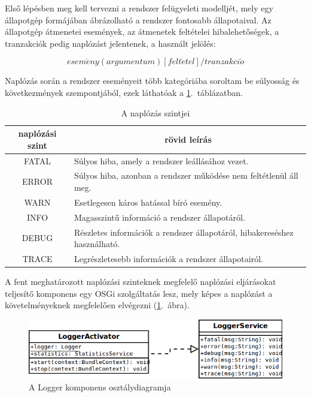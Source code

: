 Első lépésben meg kell tervezni a rendszer felügyeleti modelljét, mely egy állapotgép formájában ábrázolható a rendszer fontosabb állapotaival. Az állapotgép átmenetei események, az átmenetek feltételei hibalehetőségek, a tranzakciók pedig naplózást jelentenek, a használt jelölés:

\begin{equation}
	esem\acute{e}ny(argumentum) [felt\acute{e}tel] / tranzakci\acute{o}
\end{equation}

Naplózás során a rendszer eseményeit több kategóriába soroltam be súlyosság és következmények szempontjából, ezek láthatóak a \ref{tab:loglevels}.~táblázatban.

\begin{table}[htb]
\begin{center}
\begin{tabular}{|c|l|}
\hline
\multicolumn{1}{|c|}{\textbf{naplózási szint}} & \multicolumn{1}{|c|}{\textbf{rövid leírás}} \\ \hline \hline
FATAL & Súlyos hiba, amely a rendszer leállásához vezet. \\ \hline
ERROR & Súlyos hiba, azonban a rendszer működése nem feltétlenül áll meg. \\ \hline
WARN  & Esetlegesen káros hatással bíró esemény. \\ \hline
INFO  & Magasszintű információ a rendszer állapotáról. \\ \hline
DEBUG & Részletes információk a rendszer állapotáról, hibakereséshez használható. \\ \hline
TRACE & Legrészletesebb információk a rendszer állapotairól. \\
\hline
\end{tabular}
\end{center}
\caption{\label{tab:loglevels} A naplózás szintjei}
\end{table}

A fent meghatározott naplózási szinteknek megfelelő naplózási eljárásokat teljesítő komponens egy OSGi szolgáltatás lesz, mely képes a naplózást a követelményeknek megfelelően elvégezni (\ref{fig:class_logger}.~ábra).

\begin{figure}[htp]
\centering
\includegraphics[scale=0.55]{img/class_logger}
\caption{A Logger komponens osztálydiagramja}
\label{fig:class_logger}
\end{figure}

